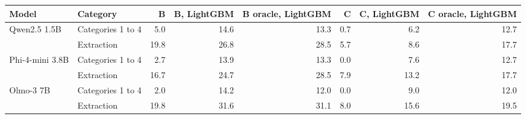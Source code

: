 \begin{tabular}{llrrrrrr}
\toprule
Model & Category & B & B, LightGBM & B oracle, LightGBM & C & C, LightGBM & C oracle, LightGBM \\
\midrule
Qwen2.5 1.5B & Categories 1 to 4 & 5.0 & 14.6 & 13.3 & 0.7 & 6.2 & 12.7 \\
 & Extraction & 19.8 & 26.8 & 28.5 & 5.7 & 8.6 & 17.7 \\
Phi-4-mini 3.8B & Categories 1 to 4 & 2.7 & 13.9 & 13.3 & 0.0 & 7.6 & 12.7 \\
 & Extraction & 16.7 & 24.7 & 28.5 & 7.9 & 13.2 & 17.7 \\
Olmo-3 7B & Categories 1 to 4 & 2.0 & 14.2 & 12.0 & 0.0 & 9.0 & 12.0 \\
 & Extraction & 19.8 & 31.6 & 31.1 & 8.0 & 15.6 & 19.5 \\
\bottomrule
\end{tabular}
